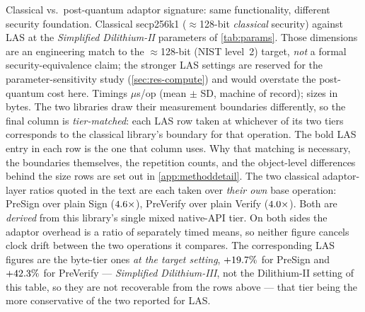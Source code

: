 \begin{table}[htbp]
  \centering
  \caption[Classical vs.\ post-quantum adaptor signature]{Classical vs.\ post-quantum
  adaptor signature: same functionality, different security foundation. Classical
  secp256k1 ($\approx$128-bit \emph{classical} security) against LAS at the
  \emph{Simplified Dilithium-II} parameters of \cref{tab:params}. Those dimensions are an
  engineering match to the $\approx$128-bit (NIST level~2) target, \emph{not} a formal
  security-equivalence claim; the stronger LAS settings are reserved for the
  parameter-sensitivity study (\cref{sec:res-compute}) and would overstate the
  post-quantum cost here. Timings $\mu$s/op (mean $\pm$ SD, machine of record); sizes in
  bytes. The two libraries draw their measurement boundaries differently, so the final
  column is \emph{tier-matched}: each LAS row taken at whichever of its two tiers
  corresponds to the classical library's boundary for that operation. The bold LAS entry
  in each row is the one that column uses. Why that matching is
  necessary, the boundaries themselves, the repetition counts, and the object-level
  differences behind the size rows are set out in \cref{app:methoddetail}. The two
  classical adaptor-layer ratios quoted in the text are each taken over \emph{their own}
  base operation: PreSign over plain Sign ($\clOvPreSignX\times$), PreVerify over
  plain Verify ($\clOvPreVerifyX\times$). Both are \emph{derived} from this library's
  single mixed native-API tier. On both sides the adaptor overhead is a ratio of
  separately timed means, so neither figure cancels clock drift between the two
  operations it compares. The corresponding LAS figures are the
  byte-tier ones \emph{at the target setting}, $+\packedOvPreSign\%$ for PreSign and
  $+\packedOvPreVerify\%$ for PreVerify --- \emph{Simplified Dilithium-III}, not the
  Dilithium-II setting of this table, so they are not recoverable from the rows above ---
  that tier being the more conservative of the two reported for LAS.}
  \label{tab:classical}
  \small
  
\end{table}


